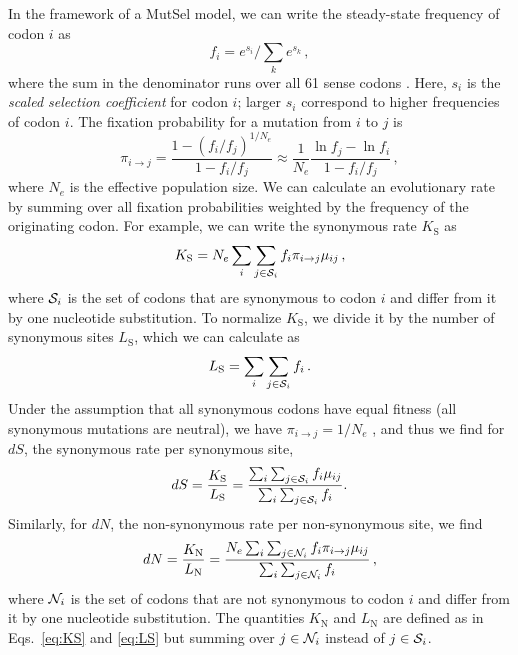 \documentclass[11pt]{article}
\begin{document}
In the framework of a MutSel model, we can write the steady-state frequency of codon $i$ as
\begin{equation}\label{eq:fi}
 f_i=e^{s_i}\Big/\sum_k e^{s_k}\,,
\end{equation}
where the sum in the denominator runs over all 61 sense codons \cite{SellaHirsh2005}. Here, $s_i$ is the \emph{scaled selection coefficient} for codon $i$; larger $s_i$ correspond to higher frequencies of codon $i$. The fixation probability for a mutation from $i$ to $j$ is \cite{HalpernBruno1998,SellaHirsh2005}
\begin{equation}\label{eq:pi}
  \pi_{i\rightarrow j} = \frac{1-(f_i/f_j)^{1/N_e}}{1-f_i/f_j}
  \approx \frac{1}{N_e} \frac{\ln f_j - \ln f_i}{1-f_i/f_j}\,,
\end{equation}
where $N_e$ is the effective population size. We can calculate an evolutionary rate by summing over all fixation probabilities weighted by the frequency of the originating codon. For example, we can write the synonymous rate $K_\text{S}$ as
\begin{equation}\label{eq:KS}
  K_\text{S} = N_e \sum_i \sum_{j \in {\cal S}_i} f_i  \pi_{i\rightarrow j}\mu_{ij}\,,
\end{equation}
where ${\cal S}_i$ is the set of codons that are synonymous to codon $i$ and differ from it by one nucleotide substitution. To normalize $K_\text{S}$, we divide it by the number of synonymous sites $L_\text{S}$, which we can calculate as 
\begin{equation}\label{eq:LS}
  L_\text{S} = \sum_i \sum_{j \in {\cal S}_i} f_i \,.
\end{equation}
Under the assumption that all synonymous codons have equal fitness (all synonymous mutations are neutral), we have $\pi_{i\rightarrow j}=1/N_e$ \cite{CrowKimura1970}, and thus we find for $dS$, the synonymous rate per synonymous site,
\begin{equation}\label{eq:dS}
  dS = \frac{K_\text{S}}{L_\text{S}}= \frac{\sum_i \sum_{j \in {\cal S}_i} f_i\mu_{ij}}{\sum_i \sum_{j \in {\cal S}_i} f_i}.
\end{equation}
Similarly, for $dN$, the non-synonymous rate per non-synonymous site, we find
\begin{equation}\label{eq:dN}
  dN = \frac{K_\text{N}}{L_\text{N}}=\frac{ N_e \sum_i \sum_{j \in {\cal N}_i} f_i  \pi_{i\rightarrow j}\mu_{ij}}{\sum_i \sum_{j \in {\cal N}_i} f_i}\,,
\end{equation}
where ${\cal N}_i$ is the set of codons that are not synonymous to codon $i$ and differ from it by one nucleotide substitution. The quantities $K_\text{N}$ and $L_\text{N}$ are defined as in Eqs.~\eqref{eq:KS} and \eqref{eq:LS} but summing over $j\in {\cal N}_i$ instead of $j\in {\cal S}_i$.
\end{document}
